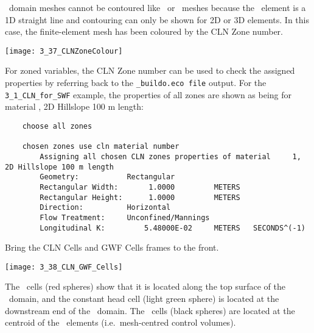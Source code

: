 \cln\ domain meshes cannot be contoured like \gwf\ or \swf\ meshes because the \cln\ element is a 1D straight line and contouring can only be shown for 2D or 3D elements.  In this case, the finite-element mesh has been coloured by the {\sf CLN Zone} number.

        \texttt{[image: 3\_37\_CLNZoneColour]}

For zoned variables, the {\sf CLN Zone} number can be used to check the assigned properties by referring back to the {\tt \_buildo.eco file} output.  For the {\tt 3\_1\_CLN\_for\_SWF} example, the properties of all zones are shown as being for material {, 2D Hillslope 100 m length}:
\begin{verbatim}
    choose all zones

    chosen zones use cln material number
    	Assigning all chosen CLN zones properties of material     1, 2D Hillslope 100 m length
    	Geometry:           Rectangular
    	Rectangular Width:       1.0000         METERS
    	Rectangular Height:      1.0000         METERS
    	Direction:          Horizontal
    	Flow Treatment:     Unconfined/Mannings
    	Longitudinal K:         5.48000E-02     METERS   SECONDS^(-1)
 \end{verbatim}

 Bring the {\sf CLN Cells} and {\sf GWF Cells} frames to the front.

        \texttt{[image: 3\_38\_CLN\_GWF\_Cells]}

The \cln\ cells (red spheres) show that it is located along the top surface of the \gwf\ domain, and the constant head cell (light green sphere) is located at the downstream end of the \cln\ domain.  The \gwf\ cells (black spheres) are located at the centroid of the \gwf\ elements (i.e.\ mesh-centred control volumes).


